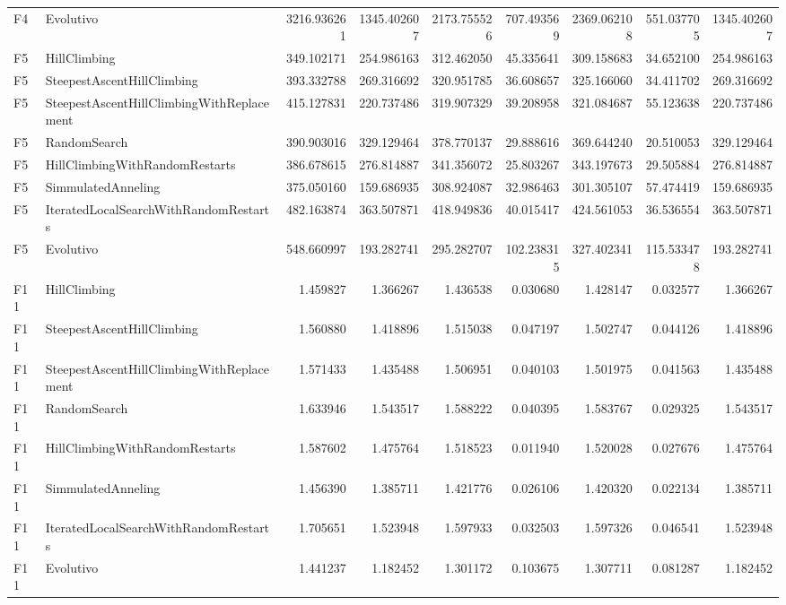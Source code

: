 \begin{tabular}{llrrrrrrr}
F4 & Evolutivo & 3216.936261 & 1345.402607 & 2173.755526 & 707.493569 & 2369.062108 & 551.037705 & 1345.402607 \\
F5 & HillClimbing & 349.102171 & 254.986163 & 312.462050 & 45.335641 & 309.158683 & 34.652100 & 254.986163 \\
F5 & SteepestAscentHillClimbing & 393.332788 & 269.316692 & 320.951785 & 36.608657 & 325.166060 & 34.411702 & 269.316692 \\
F5 & SteepestAscentHillClimbingWithReplacement & 415.127831 & 220.737486 & 319.907329 & 39.208958 & 321.084687 & 55.123638 & 220.737486 \\
F5 & RandomSearch & 390.903016 & 329.129464 & 378.770137 & 29.888616 & 369.644240 & 20.510053 & 329.129464 \\
F5 & HillClimbingWithRandomRestarts & 386.678615 & 276.814887 & 341.356072 & 25.803267 & 343.197673 & 29.505884 & 276.814887 \\
F5 & SimmulatedAnneling & 375.050160 & 159.686935 & 308.924087 & 32.986463 & 301.305107 & 57.474419 & 159.686935 \\
F5 & IteratedLocalSearchWithRandomRestarts & 482.163874 & 363.507871 & 418.949836 & 40.015417 & 424.561053 & 36.536554 & 363.507871 \\
F5 & Evolutivo & 548.660997 & 193.282741 & 295.282707 & 102.238315 & 327.402341 & 115.533478 & 193.282741 \\
F11 & HillClimbing & 1.459827 & 1.366267 & 1.436538 & 0.030680 & 1.428147 & 0.032577 & 1.366267 \\
F11 & SteepestAscentHillClimbing & 1.560880 & 1.418896 & 1.515038 & 0.047197 & 1.502747 & 0.044126 & 1.418896 \\
F11 & SteepestAscentHillClimbingWithReplacement & 1.571433 & 1.435488 & 1.506951 & 0.040103 & 1.501975 & 0.041563 & 1.435488 \\
F11 & RandomSearch & 1.633946 & 1.543517 & 1.588222 & 0.040395 & 1.583767 & 0.029325 & 1.543517 \\
F11 & HillClimbingWithRandomRestarts & 1.587602 & 1.475764 & 1.518523 & 0.011940 & 1.520028 & 0.027676 & 1.475764 \\
F11 & SimmulatedAnneling & 1.456390 & 1.385711 & 1.421776 & 0.026106 & 1.420320 & 0.022134 & 1.385711 \\
F11 & IteratedLocalSearchWithRandomRestarts & 1.705651 & 1.523948 & 1.597933 & 0.032503 & 1.597326 & 0.046541 & 1.523948 \\
F11 & Evolutivo & 1.441237 & 1.182452 & 1.301172 & 0.103675 & 1.307711 & 0.081287 & 1.182452 \\
\bottomrule
\end{tabular}
